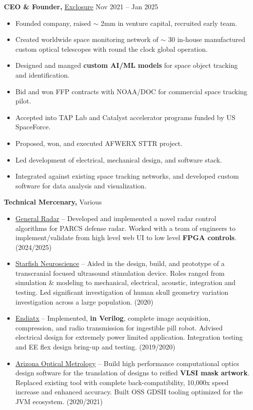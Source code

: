 \documentclass{res}
\begin{document}
\begin{resume}
{\bf CEO \& Founder,} \href{http://www.exclosure.io}{Exclosure} \hfill
Nov 2021 -- Jan 2025
\begin{itemize}  \itemsep -2pt
  \item Founded company, raised $\sim$ 2mm in venture capital, recruited early team.
  \item Created worldwide space monitoring network of $\sim$ 30
        in-house manufactured custom optical telescopes with round the clock global operation.
  \item Designed and manged \textbf{custom AI/ML models} for space object tracking and identification.
  \item Bid and won FFP contracts with NOAA/DOC for commercial space tracking pilot.
  \item Accepted into TAP Lab and Catalyst accelerator programs funded by US SpaceForce.
  \item Proposed, won, and executed AFWERX STTR project.
  \item Led development of electrical, mechanical design, and software stack.
  \item Integrated against existing space tracking networks, and developed custom
        software for data analysis and visualization.
\end{itemize}

{\bf Technical Mercenary,} Various \hfill
\begin{itemize}  \itemsep -2pt
  \item \href{https://www.genrad.com/}{General Radar} -- Developed and implemented a novel radar control algorithms
        for PARCS defense radar. Worked with a team of engineers to implement/validate from high
        level web UI to low level \textbf{FPGA controls}. (2024/2025)
  \item \href{https://starfishneuroscience.com/}{Starfish Neuroscience} -- Aided in the design, build, and prototype of a transcranial
        focused ultrasound stimulation device. Roles ranged from simulation \& modeling to
        mechanical, electrical, acoustic, integration and testing. Led significant investigation
        of human skull geometry variation investigation across a large population. (2020)
  \item \href{https://endiatx.com/}{Endiatx} -- Implemented, \textbf{in Verilog}, complete image acquisition, compression, and radio
        transmission for ingestible pill robot. Advised electrical design for extremely power limited application.
        Integration testing and EE flex design bring-up and testing. (2019/2020)
  \item \href{https://aom.us/}{Arizona Optical Metrology} -- Build high performance computational optics design software
        for the translation of designs to reified \textbf{VLSI mask artwork}.
        Replaced existing tool with complete back-compatibility, 10,000x speed increase and enhanced accuracy.
        Built OSS GDSII tooling optimized for the JVM ecosystem. (2020/2021)
\end{itemize}


\end{resume}
\end{document}
